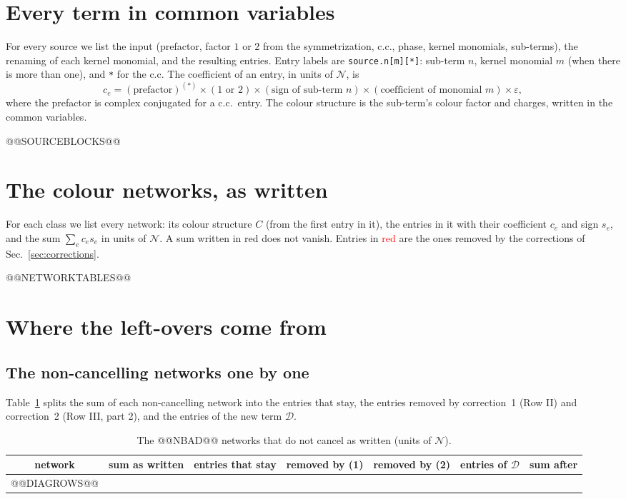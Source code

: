 \documentclass[10pt]{article}
\numberwithin{equation}{section}
\newcommand{\NN}{\mathcal N}
\newcommand{\lab}[1]{\texttt{#1}}
\begin{document}
\section{Every term in common variables}\label{sec:entries}

For every source we list the input (prefactor, factor $1$ or $2$ from the symmetrization, c.c., phase, kernel monomials, sub-terms), the renaming of each kernel monomial, and the resulting entries. Entry labels are \lab{source.n[m][*]}: sub-term $n$, kernel monomial $m$ (when there is more than one), and \lab{*} for the c.c. The coefficient of an entry, in units of $\NN$, is
\begin{equation}
c_e=(\text{prefactor})^{(*)}\times(1\text{ or }2)\times(\text{sign of sub-term }n)\times(\text{coefficient of monomial }m)\times\varepsilon,
\end{equation}
where the prefactor is complex conjugated for a c.c.\ entry. The colour structure is the sub-term's colour factor and charges, written in the common variables.

@@SOURCEBLOCKS@@

\section{The colour networks, as written}\label{sec:networks}

For each class we list every network: its colour structure $C$ (from the first entry in it), the entries in it with their coefficient $c_e$ and sign $s_e$, and the sum $\sum_e c_es_e$ in units of $\NN$. A sum written in red does not vanish. Entries in \textcolor{red}{red} are the ones removed by the corrections of Sec.~\ref{sec:corrections}.

@@NETWORKTABLES@@

\section{Where the left-overs come from}\label{sec:diagnosis}

\subsection{The non-cancelling networks one by one}
Table~\ref{tab:diag} splits the sum of each non-cancelling network into the entries that stay, the entries removed by correction~1 (Row II) and correction~2 (Row III, part 2), and the entries of the new term $\mathcal D$.

\begin{table}[h]
\centering\small
\begin{tabular}{@{}c c c c c c c@{}}
network & sum as written & entries that stay & removed by (1) & removed by (2) & entries of $\mathcal D$ & sum after\\ \hline
@@DIAGROWS@@
\end{tabular}
\caption{The @@NBAD@@ networks that do not cancel as written (units of $\NN$).}
\label{tab:diag}
\end{table}
\end{document}
